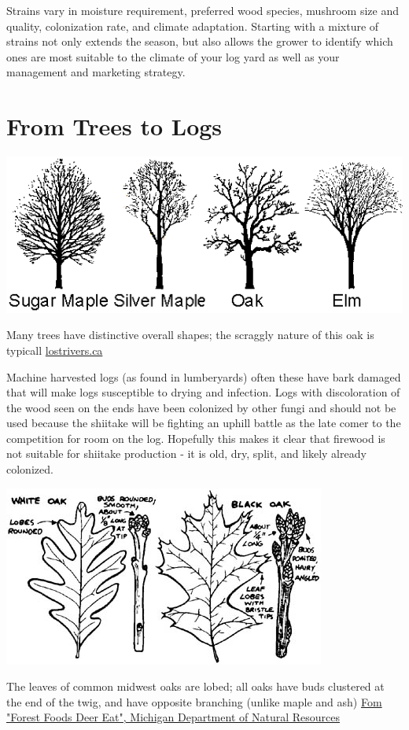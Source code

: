 \documentclass{tufte-handout}
\begin{document}
Strains vary in moisture requirement, preferred wood species, mushroom size and quality, colonization rate, and climate adaptation. 
Starting with a mixture of strains not only extends the season,  but also allows the grower to identify which ones are most
suitable to the climate of your log yard as well as your management
and marketing strategy.

\section{From Trees to Logs}

\begin{marginfigure}
\includegraphics{tree-forms}
\caption{Many trees have distinctive overall shapes; the scraggly nature of this oak is typicall \href{http://www.lostrivers.ca/content/points/treeswinter.html}{lostrivers.ca}}
\end{marginfigure}

 Machine harvested logs (as found in lumberyards) often these have bark damaged that will make logs susceptible to drying and infection. 
Logs with discoloration of the wood seen on the ends have been colonized by other fungi and should not be used because the shiitake will be fighting an uphill battle as the late comer to the competition for room on the log.
Hopefully this makes it clear that firewood is not suitable for shiitake production - it is old, dry, split, and likely already colonized.

\begin{marginfigure}
\includegraphics{oak-leaves-twigs}
\caption{The leaves of common midwest oaks are lobed; all oaks have buds clustered at the end of the twig, and have opposite branching (unlike maple and ash)  
\href{http://www.michigan.gov/dnr/0,4570,7-153-10370_12148-61306--,00.html}{Fom "Forest Foods Deer Eat", Michigan Department of Natural Resources}
}
\end{marginfigure}
\end{document}

